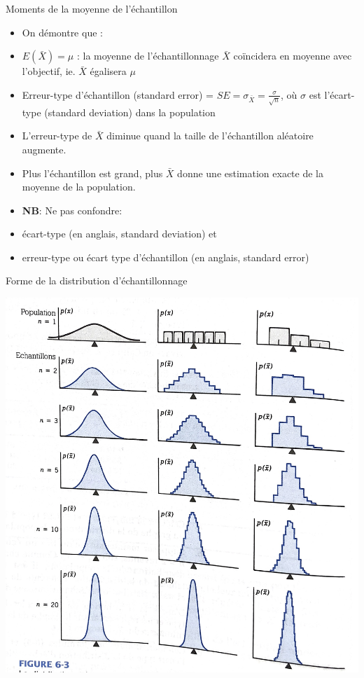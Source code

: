 \documentclass[ignorenonframetext,]{beamer}
\begin{document}
\begin{frame}{Moments de la moyenne de l'échantillon}

\begin{itemize}
\item
  On démontre que :
\item
  \(E(\bar{X}) = \mu\) : la moyenne de l'échantillonnage \(\bar{X}\)
  coïncidera en moyenne avec l'objectif, ie. \(\bar{X}\) égalisera
  \(\mu\)
\item
  Erreur-type d'échantillon (standard error) =
  \(SE = \sigma_{\bar{X}} = \frac{\sigma}{\sqrt{n}}\), où \(\sigma\) est
  l'écart-type (standard deviation) dans la population
\item
  L'erreur-type de \(\bar{X}\) diminue quand la taille de l'échantillon
  aléatoire augmente.
\item
  Plus l'échantillon est grand, plus \(\bar{X}\) donne une estimation
  exacte de la moyenne de la population.
\item
  \textbf{NB}: Ne pas confondre:
\item
  écart-type (en anglais, standard deviation) et
\item
  erreur-type ou écart type d'échantillon (en anglais, standard error)
\end{itemize}

\end{frame}

\begin{frame}{Forme de la distribution d'échantillonnage}

\includegraphics[width=0.7\linewidth]{distribution_echantillonnage}

\end{frame}
\end{document}

